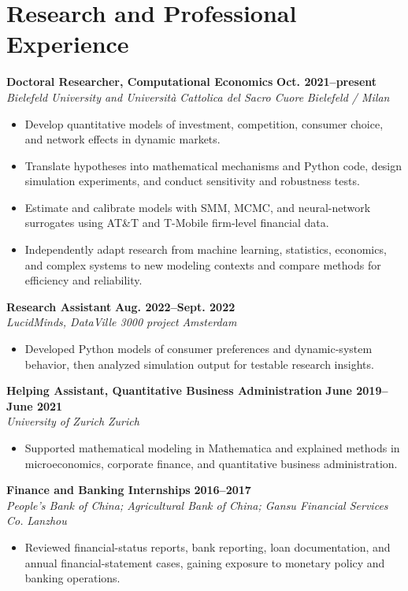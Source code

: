 \documentclass[a4paper,11pt]{article}
\newcommand{\role}[4]{%
  \textbf{#1} \hfill \textbf{#2}\\
  \textit{#3} \hfill \textit{#4}\par
}
\begin{document}
\section{Research and Professional Experience}
\role{Doctoral Researcher, Computational Economics}{Oct. 2021--present}{Bielefeld University and Universit\`a Cattolica del Sacro Cuore}{Bielefeld / Milan}
\begin{itemize}
  \item Develop quantitative models of investment, competition, consumer choice, and network effects in dynamic markets.
  \item Translate hypotheses into mathematical mechanisms and Python code, design simulation experiments, and conduct sensitivity and robustness tests.
  \item Estimate and calibrate models with SMM, MCMC, and neural-network surrogates using AT\&T and T-Mobile firm-level financial data.
  \item Independently adapt research from machine learning, statistics, economics, and complex systems to new modeling contexts and compare methods for efficiency and reliability.
\end{itemize}

\role{Research Assistant}{Aug. 2022--Sept. 2022}{LucidMinds, DataVille 3000 project}{Amsterdam}
\begin{itemize}
  \item Developed Python models of consumer preferences and dynamic-system behavior, then analyzed simulation output for testable research insights.
\end{itemize}

\role{Helping Assistant, Quantitative Business Administration}{June 2019--June 2021}{University of Zurich}{Zurich}
\begin{itemize}
  \item Supported mathematical modeling in Mathematica and explained methods in microeconomics, corporate finance, and quantitative business administration.
\end{itemize}

\role{Finance and Banking Internships}{2016--2017}{People's Bank of China; Agricultural Bank of China; Gansu Financial Services Co.}{Lanzhou}
\begin{itemize}
  \item Reviewed financial-status reports, bank reporting, loan documentation, and annual financial-statement cases, gaining exposure to monetary policy and banking operations.
\end{itemize}
\end{document}
